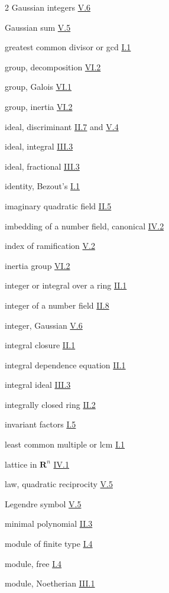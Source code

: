 \begin{multicols}{2}
Gaussian integers \hyperref[sec:5.6]{V.6}

Gaussian sum \hyperref[sec:5.5]{V.5}

greatest common divisor or gcd \hyperref[sec:1.1]{I.1}

group, decomposition \hyperref[sec:6.2]{VI.2}

group, Galois \hyperref[sec:6.1]{VI.1}

group, inertia \hyperref[sec:6.2]{VI.2}

\medskip
ideal, discriminant \hyperref[sec:2.7]{II.7} and \hyperref[sec:5.4]{V.4}

ideal, integral \hyperref[sec:3.3]{III.3}

ideal, fractional \hyperref[sec:3.3]{III.3}

\medskip
identity, Bezout's \hyperref[sec:1.1]{I.1}

imaginary quadratic field \hyperref[sec:2.5]{II.5}

imbedding of a number field, canonical \hyperref[sec:4.2]{IV.2}

index of ramification \hyperref[sec:5.2]{V.2}

inertia group \hyperref[sec:6.2]{VI.2}

integer or integral over a ring \hyperref[sec:2.1]{II.1}

integer of a number field \hyperref[sec:2.8]{II.8}

integer, Gaussian \hyperref[sec:5.6]{V.6}

integral closure \hyperref[sec:2.1]{II.1}

integral dependence equation \hyperref[sec:2.1]{II.1}

integral ideal \hyperref[sec:3.3]{III.3}

integrally closed ring \hyperref[sec:2.2]{II.2}

invariant factors \hyperref[sec:1.5]{I.5}

\medskip
least common multiple or lcm \hyperref[sec:1.1]{I.1}

lattice in $\mathbf{R}^{n}$ \hyperref[sec:4.1]{IV.1}

law, quadratic reciprocity \hyperref[sec:5.5]{V.5}

Legendre symbol \hyperref[sec:5.5]{V.5}

\medskip
minimal polynomial \hyperref[sec:2.3]{II.3}

module of finite type \hyperref[sec:1.4]{I.4}

module, free \hyperref[sec:1.4]{I.4}

module, Noetherian \hyperref[sec:3.1]{III.1}


\end{multicols}
